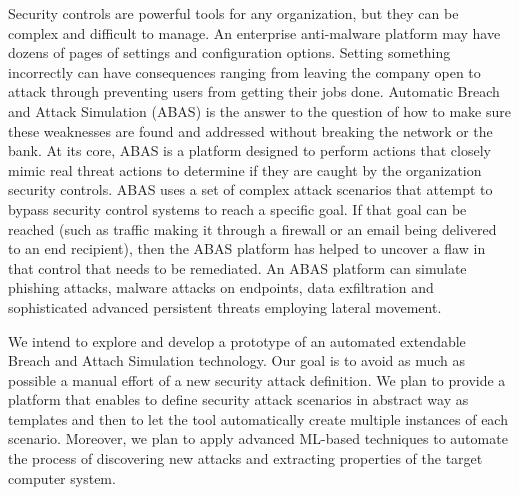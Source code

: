 \documentclass[a4paper,11pt]{article}
\begin{document}
Security controls are powerful tools for any organization, but they can be complex and difficult to manage. An enterprise anti-malware platform may have dozens of pages of settings and configuration options. Setting something incorrectly can have consequences ranging from leaving the company open to attack through preventing users from getting their jobs done.
Automatic Breach and Attack Simulation (ABAS) is the answer to the question of how to make sure these weaknesses are found and addressed without breaking the network or the bank. At its core, ABAS is a platform designed to perform actions that closely mimic real threat actions to determine if they are caught by the organization security controls.
ABAS uses a set of complex attack scenarios that attempt to bypass security control systems to reach a specific goal. If that goal can be reached (such as traffic making it through a firewall or an email being delivered to an end recipient), then the ABAS platform has helped to uncover a flaw in that control that needs to be remediated. An ABAS platform can simulate phishing attacks, malware attacks on endpoints, data exfiltration and sophisticated advanced persistent threats employing lateral movement.

We intend to explore and develop a prototype of an automated extendable Breach and Attach Simulation technology. Our goal is to avoid as much as possible a manual effort of a new security attack definition. We plan to provide a platform that enables to define security attack scenarios in abstract way as templates and then to let the tool automatically create multiple instances of each scenario. Moreover, we plan to apply advanced ML-based techniques to automate the process of discovering new attacks and extracting properties of the target computer system.
\end{document}
